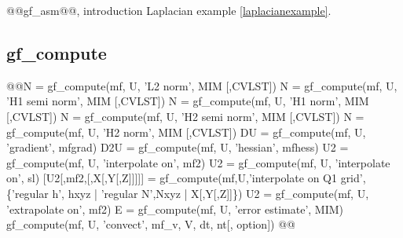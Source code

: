 \begin{gfseealso}
  @@gf\_asm@@, introduction Laplacian example \ref{laplacianexample}.%
\end{gfseealso}
\newpage


\subsection{gf\_compute}
\begin{synopsis}
@@N = gf\_compute(mf, U, 'L2 norm', \tmim MIM [,\tivec CVLST])
N = gf\_compute(mf, U, 'H1 semi norm', \tmim MIM [,CVLST])
N = gf\_compute(mf, U, 'H1 norm', \tmim MIM [,\tivec CVLST])
N = gf\_compute(mf, U, 'H2 semi norm', \tmim MIM [,CVLST])
N = gf\_compute(mf, U, 'H2 norm', \tmim MIM [,\tivec CVLST])
DU = gf\_compute(mf, U, 'gradient', \tmf mfgrad)
D2U = gf\_compute(mf, U, 'hessian', \tmf mfhess)
U2 = gf\_compute(mf, U, 'interpolate on', \tmf mf2)
U2 = gf\_compute(mf, U, 'interpolate on', \tslc sl)
[U2[,mf2,[,X[,Y[,Z]]]]] = gf\_compute(mf,U,'interpolate on Q1 grid', 
        \{'regular h', hxyz | 'regular N',Nxyz | X[,Y[,Z]]\})
U2 = gf\_compute(mf, U, 'extrapolate on', \tmf mf2)
E = gf\_compute(mf, U, 'error estimate',  \tmim MIM)
gf\_compute(mf, U, 'convect', \tmf mf_v, \tvec V, \tscal dt, \tint nt[, \tstr option]) 
@@\end{synopsis}
